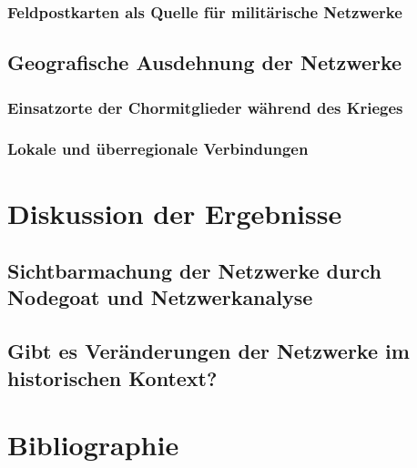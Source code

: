 \documentclass[12pt, a4paper, ngerman, bidi=default]{article}
\begin{document}
\begin{description}
    \subsubsection{Feldpostkarten als Quelle für militärische Netzwerke}
    
 \subsection{ Geografische Ausdehnung der Netzwerke}
  \subsubsection{Einsatzorte der Chormitglieder während des Krieges}
  \subsubsection{ Lokale und überregionale Verbindungen}
  \newpage
\section{Diskussion der Ergebnisse}
  \subsection{Sichtbarmachung der Netzwerke durch Nodegoat und Netzwerkanalyse}
  \subsection{Gibt es Veränderungen der Netzwerke im historischen Kontext?}
  \newpage

\section{Bibliographie}



\end{description}
\end{document}
